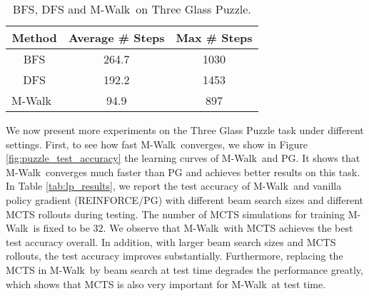 \documentclass{article}
\newcommand{\modelname}{M-Walk}
\begin{document}
	\begin{table}[t]
		\centering
		\caption{Three Glass Puzzle test accuracy (\%), where ``Beam'' denotes beam search.}
		\label{tab:lp_results}
	\end{table}
	
		\begin{table}[t]
		\centering
		{\caption{BFS, DFS and \modelname~on Three Glass Puzzle.}
			\label{tab:graph_traversal_results}
			\begin{tabular}{|c|c|c|}
				\hline
				{Method} & {Average \# Steps} & {Max \# Steps} \\
				\hline
				BFS & 264.7 & 1030 \\
				DFS & 192.2 & 1453 \\
				\modelname~& 94.9 & 897 \\
				\hline
			\end{tabular}
		}
	\end{table}
	
We now present more experiments on the Three Glass Puzzle task under different settings. First, to see how fast \modelname~converges, we show in Figure \ref{fig:puzzle_test_accuracy} the learning curves of \modelname~and PG. It shows that \modelname~converges much faster than PG and achieves better results on this task. In Table \ref{tab:lp_results}, we report the test accuracy of \modelname~and vanilla policy gradient (REINFORCE/PG) with different beam search sizes and different MCTS rollouts during testing. The number of MCTS simulations for training \modelname~is fixed to be $32$. 
We observe that \modelname~with MCTS achieves the best test accuracy overall. In addition, with larger beam search sizes and MCTS rollouts, the test accuracy improves substantially. Furthermore, replacing the MCTS in \modelname~by beam search at test time degrades the performance greatly, which shows that MCTS is also very important for \modelname~at test time. 
\end{document}
